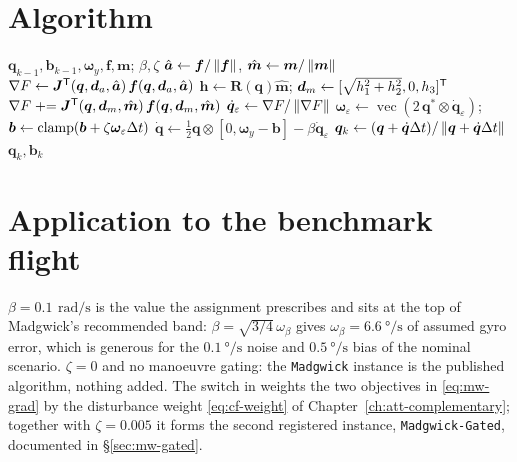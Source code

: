 \section{Algorithm}
\begin{algorithm}[H]
\caption{Madgwick MARG --- one sampling period}
\begin{algorithmic}[1]
\Require $\bm{q}_{k-1},\bm{b}_{k-1},\bm{\omega}_y,\bm{f},\bm{m}$; $\beta,\zeta$
\State $\hat{\bm{a}}\gets\bm{f}/\left\lVert \bm{f} \right\rVert$, \; $\hat{\bm{m}}\gets\bm{m}/\left\lVert \bm{m} \right\rVert$
\State $\nabla F \gets \bm{J}^{\mathsf{T}}(\bm{q},\bm{d}_a,\hat{\bm{a}})\,\bm{f}(\bm{q},\bm{d}_a,\hat{\bm{a}})$
\State $\bm{h}\gets\bm{R}(\bm{q})\hat{\bm{m}}$;\; $\bm{d}_m\gets[\sqrt{h_1^2+h_2^2},0,h_3]^{\mathsf{T}}$
\State $\nabla F \mathrel{+}= \bm{J}^{\mathsf{T}}(\bm{q},\bm{d}_m,\hat{\bm{m}})\,\bm{f}(\bm{q},\bm{d}_m,\hat{\bm{m}})$
\State $\dot{\bm{q}}_\varepsilon\gets\nabla F/\left\lVert \nabla F \right\rVert$
 
  \State $\bm{\omega}_\varepsilon\gets\operatorname{vec}(2\,\bm{q}^*\otimes\dot{\bm{q}}_\varepsilon)$;\;
         $\bm{b}\gets\operatorname{clamp}(\bm{b}+\zeta\bm{\omega}_\varepsilon\Delta t)$
\EndIf
\State $\dot{\bm{q}}\gets\tfrac12\bm{q}\otimes[0,\bm{\omega}_y-\bm{b}]-\beta\dot{\bm{q}}_\varepsilon$
\State $\bm{q}_k\gets(\bm{q}+\dot{\bm{q}}\Delta t)/\left\lVert \bm{q}+\dot{\bm{q}}\Delta t \right\rVert$
\Ensure $\bm{q}_k,\bm{b}_k$
\end{algorithmic}
\end{algorithm}

\section{Application to the benchmark flight}
$\beta=0.1\,\SI{}{\radian\per\second}$ is the value the assignment prescribes and sits at the top of
Madgwick's recommended band: $\beta=\sqrt{3/4}\,\omega_\beta$ gives
$\omega_\beta=\SI{6.6}{\degree\per\second}$ of assumed gyro error, which is generous for the
$\SI{0.1}{\degree\per\second}$ noise and $\SI{0.5}{\degree\per\second}$ bias of the nominal
scenario. $\zeta=0$ and no manoeuvre gating: the \texttt{Madgwick} instance is the published algorithm,
nothing added. The  switch in  weights the two objectives in
\eqref{eq:mw-grad} by the disturbance weight \eqref{eq:cf-weight} of
Chapter~\ref{ch:att-complementary}; together with $\zeta=0.005$ it forms the second registered
instance, \texttt{Madgwick-Gated}, documented in \S\ref{sec:mw-gated}.

